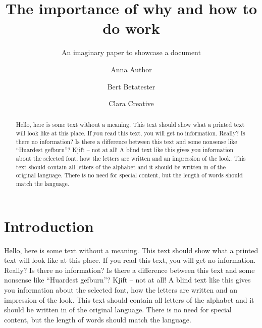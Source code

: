 \documentclass[%
  english,%
  todotools=true,%
  trtype=inproceedings%
]{hpitr}
\begin{document}
\title{The importance of why and how to do work}
\subtitle{An imaginary paper to showcase a document}
\author{Anna Author\and Bert Betatester\and Clara Creative}
\maketitle

\begin{abstract}
  Hello, here is some text without a meaning. This text should show
  what a printed text will look like at this place. If you read this
  text, you will get no information. Really? Is there no
  information? Is there a difference between this text and some
  nonsense like “Huardest gefburn”? Kjift – not at all! A blind text
  like this gives you information about the selected font, how the
  letters are written and an impression of the look. This text
  should contain all letters of the alphabet and it should be
  written in of the original language. There is no need for special
  content, but the length of words should match the language.
\end{abstract}


\section{Introduction}
\label{sec:introduction}

Hello, here is some text without a meaning. This text should show
what a printed text will look like at this place. If you read this
text, you will get no information. Really? Is there no information?
Is there a difference between this text and some nonsense like
“Huardest gefburn”? Kjift – not at all! A blind text like this gives
you information about the selected font, how the letters are written
and an impression of the look. This text should contain all letters
of the alphabet and it should be written in of the original
language. There is no need for special content, but the length of
words should match the language.
\end{document}
